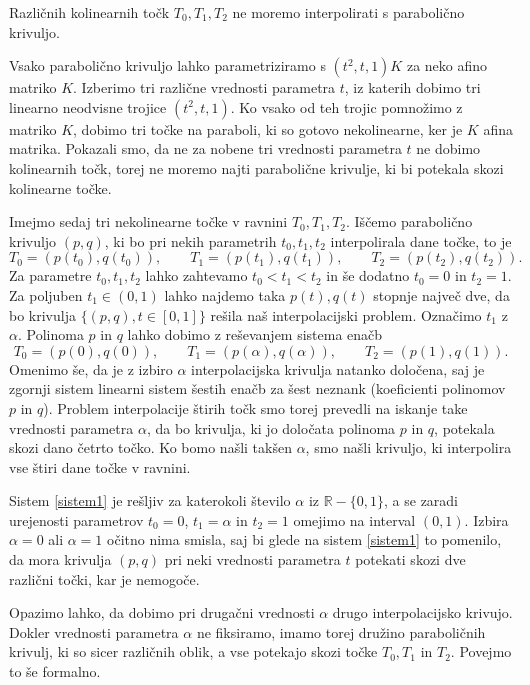 \documentclass[mat1]{fmfdelo}
\newcommand{\R}{\mathbb R}
\newcommand{\al}{\alpha}
\begin{document}
\begin{trditev}
Različnih kolinearnih točk $T_0, T_1, T_2$ ne moremo interpolirati s parabolično krivuljo.
\end{trditev}



\begin{dokaz}
Vsako parabolično krivuljo lahko parametriziramo s $(t^2, t,1)K$ za neko afino matriko $K$. Izberimo tri različne vrednosti parametra $t$, iz katerih dobimo tri linearno neodvisne trojice $(t^2, t, 1)$. Ko vsako od teh trojic pomnožimo z matriko $K$, dobimo tri točke na paraboli, ki so gotovo nekolinearne, ker je $K$ afina matrika. Pokazali smo, da ne za nobene tri vrednosti parametra $t$ ne dobimo kolinearnih točk, torej ne moremo najti parabolične krivulje, ki bi potekala skozi kolinearne točke.
\end{dokaz}

Imejmo sedaj tri nekolinearne točke v ravnini $T_0, T_1, T_2$. Iščemo parabolično krivuljo $(p, q)$, ki bo pri nekih parametrih $t_0, t_1, t_2$ interpolirala dane točke, to je %
$$ T_0 = (p(t_0), q(t_0)), \qquad T_1 = (p(t_1), q(t_1)), \qquad T_2 = (p(t_2), q(t_2)).$$
Za parametre $t_0, t_1, t_2$ lahko zahtevamo $t_0 < t_1 < t_2$ in še dodatno $t_0 = 0$ in $t_2 = 1$. Za poljuben $t_1 \in (0,1)$  lahko najdemo taka $p(t), q(t)$ stopnje največ dve, da bo krivulja $ \{(p, q), t \in [0,1] \}$ rešila naš interpolacijski problem. Označimo $t_1$ z $\al.$  Polinoma $p$ in $q$  lahko dobimo z reševanjem sistema enačb
%
\begin{equation}\label{sistem1}
T_0 = (p(0), q(0)), \qquad T_1 = (p(\al), q(\al)), \qquad T_2 = (p(1), q(1)).
\end{equation}
%
Omenimo še, da je z izbiro $\al$ interpolacijska krivulja natanko določena, saj je zgornji sistem linearni sistem šestih enačb za šest neznank (koeficienti polinomov $p$ in $q$). Problem interpolacije štirih točk smo torej prevedli na iskanje take vrednosti parametra $\al$, da bo krivulja, ki jo določata polinoma $p$ in $q$, potekala skozi dano četrto točko. Ko bomo našli takšen $\al$, smo našli krivuljo, ki interpolira vse štiri dane točke v ravnini.
%
\begin{opomba}
Sistem \eqref{sistem1} je rešljiv za katerokoli število $\al$ iz $\R - \{ 0, 1\}$, a se zaradi urejenosti parametrov $t_0 = 0$, $t_1 = \al$ in $t_2 = 1$ omejimo na interval $(0, 1)$. Izbira $\al = 0$ ali $\al = 1$ očitno nima smisla, saj bi glede na sistem \eqref{sistem1} to pomenilo, da mora krivulja $(p, q)$ pri neki vrednosti parametra $t$ potekati skozi dve različni točki, kar je nemogoče.
\end{opomba}
%
Opazimo lahko, da dobimo pri drugačni vrednosti $\al$ drugo interpolacijsko krivujo. Dokler vrednosti parametra $\al$ ne fiksiramo, imamo torej družino paraboličnih krivulj, ki so sicer različnih oblik, a vse potekajo skozi točke $T_0, T_1$ in $T_2$. Povejmo to še formalno.
\end{document}
